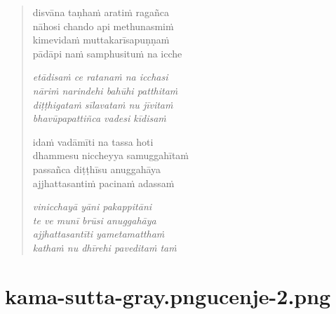 

\cleartoverso

\vspace*{30mm}

\begin{verse}

disvāna taṇhaṁ aratiṁ ragañca\\
nāhosi chando api methunasmiṁ\\
kimevidaṁ muttakarīsapuṇṇaṁ\\
pādāpi naṁ samphusituṁ na icche

\emph{etādisaṁ ce ratanaṁ na icchasi}\\
\emph{nāriṁ narindehi bahūhi patthitaṁ}\\
\emph{diṭṭhigataṁ sīlavataṁ nu jīvitaṁ}\\
\emph{bhavūpapattiñca vadesi kīdisaṁ}

idaṁ vadāmīti na tassa hoti\\
dhammesu niccheyya samuggahītaṁ\\
passañca diṭṭhīsu anuggahāya\\
ajjhattasantiṁ pacinaṁ adassaṁ

\emph{vinicchayā yāni pakappitāni}\\
\emph{te ve munī brūsi anuggahāya}\\
\emph{ajjhattasantīti yametamatthaṁ}\\
\emph{kathaṁ nu dhīrehi paveditaṁ taṁ}

\end{verse}


\chapter[Māgaṇḍiya Sutta]{{kama-sutta-gray.png}{ucenje-2.png}}

